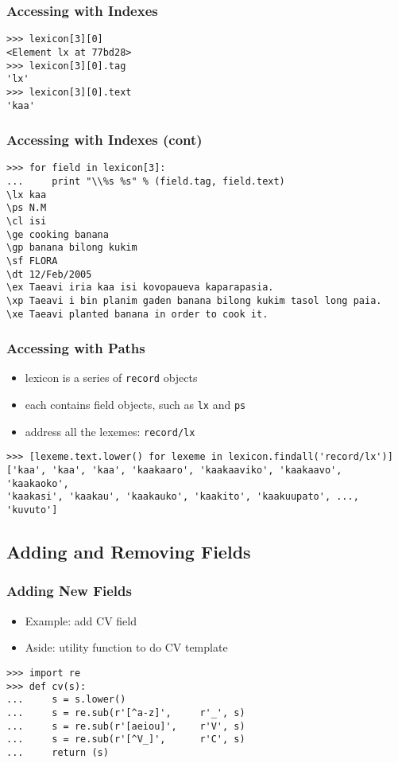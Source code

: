 \documentclass{beamer}             %
\begin{document}
\begin{frame}[fragile]
\frametitle{Accessing with Indexes}

\begin{verbatim}
>>> lexicon[3][0] 
<Element lx at 77bd28>
>>> lexicon[3][0].tag
'lx'
>>> lexicon[3][0].text
'kaa'
\end{verbatim}
\end{frame}

\begin{frame}[fragile]
\frametitle{Accessing with Indexes (cont)}

\scriptsize
\begin{verbatim}
>>> for field in lexicon[3]:
...     print "\\%s %s" % (field.tag, field.text)
\lx kaa
\ps N.M
\cl isi
\ge cooking banana
\gp banana bilong kukim
\sf FLORA
\dt 12/Feb/2005
\ex Taeavi iria kaa isi kovopaueva kaparapasia.
\xp Taeavi i bin planim gaden banana bilong kukim tasol long paia.
\xe Taeavi planted banana in order to cook it.
\end{verbatim}
\end{frame}

\begin{frame}[fragile]
\frametitle{Accessing with Paths}

\begin{itemize}
\item lexicon is a series of \texttt{record} objects
\item each contains field objects, such as \texttt{lx} and \texttt{ps}
\item address all the lexemes: \texttt{record/lx}
\end{itemize}

\small
\begin{verbatim}
>>> [lexeme.text.lower() for lexeme in lexicon.findall('record/lx')]
['kaa', 'kaa', 'kaa', 'kaakaaro', 'kaakaaviko', 'kaakaavo', 'kaakaoko',
'kaakasi', 'kaakau', 'kaakauko', 'kaakito', 'kaakuupato', ..., 'kuvuto']
\end{verbatim}
\end{frame}

\subsection{Adding and Removing Fields}

\begin{frame}[fragile]
\frametitle{Adding New Fields}
\small

\begin{itemize}
\item Example: add CV field
\item Aside: utility function to do CV template
\end{itemize}

\begin{verbatim}
>>> import re
>>> def cv(s):
...     s = s.lower()
...     s = re.sub(r'[^a-z]',     r'_', s)
...     s = re.sub(r'[aeiou]',    r'V', s)
...     s = re.sub(r'[^V_]',      r'C', s)
...     return (s)
\end{verbatim}
\end{frame}
\end{document}
